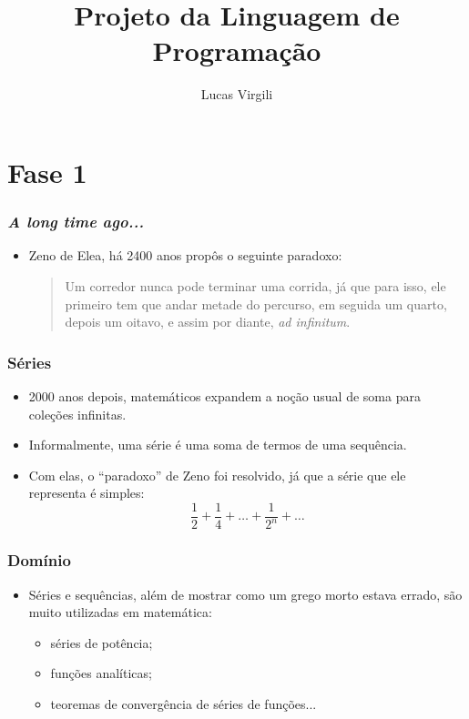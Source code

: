 \documentclass{beamer}
\title{Projeto da Linguagem de Programa\c c\~ao}
\author{Lucas Virgili}
\date{}
\begin{document}
\begin{frame}[fragile]
  \titlepage
\end{frame}

\section{Fase 1}

\begin{frame}[fragile]
  \frametitle{\emph{A long time ago...}}
  \begin{itemize}
  \item Zeno de Elea, h\'a 2400 anos prop\^os o seguinte paradoxo:
    \begin{quote}
        Um corredor nunca pode terminar uma corrida, j\'a que para isso,
        ele primeiro tem que andar metade do percurso, em seguida um quarto,
        depois um oitavo, e assim por diante, \emph{ad infinitum}.
    \end{quote}
  \end{itemize}
\end{frame}

\begin{frame}[fragile]
  \frametitle{S\'eries}
  \begin{itemize}
  \item 2000 anos depois, matem\'aticos expandem a no\c c\~ao usual de
    soma para cole\c c\~oes infinitas.
  \item Informalmente, uma s\'erie \'e uma soma de termos de uma
    sequ\^encia.
  \item Com elas, o ``paradoxo'' de Zeno foi resolvido, j\'a que a
    s\'erie que ele representa \'e simples:
    \begin{equation}
      \frac{1}{2} + \frac{1}{4} + \ldots + \frac{1}{2^n} + \ldots
    \end{equation}
  \end{itemize}
\end{frame}

\begin{frame}[fragile]
  \frametitle{Dom\'inio}
  \begin{itemize}
  \item S\'eries e sequ\^encias, al\'em de mostrar como um grego morto
    estava errado, s\~ao muito utilizadas em matem\'atica:
    \begin{itemize}
    \item s\'eries de pot\^encia;
    \item fun\c c\~oes anal\'iticas;
    \item teoremas de converg\^encia de s\'eries de fun\c c\~oes...
    \end{itemize}
  \end{itemize}
\end{frame}
\end{document}
